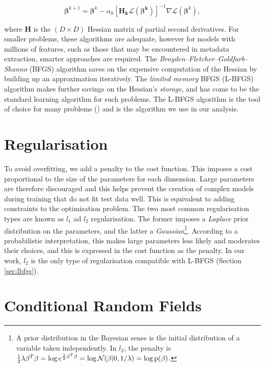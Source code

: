 \begin{equation}
\boldsymbol\beta^{k+1} = \boldsymbol\beta^{k} - \alpha_k [\mathbf{H_k\mathcal{L}(\boldsymbol\beta^{k})}]^{-1}\nabla\mathcal{L}(\boldsymbol\beta^{k}),
\label{eq:newton}
\end{equation}

where $\mathbf{H}$ is the $(D \times D)$ Hessian matrix of partial second derivatives. For smaller problems, these algorithms are adequate, however for models with millions of features, such as those that may be encountered in metadata extraction, smarter approaches are required. The \emph{Broyden--Fletcher--Goldfarb--Shanno} (BFGS) algorithm saves on the expensive computation of the Hessian by building up an approximation iteratively. The \emph{limited memory} BFGS (L-BFGS) algorithm makes further savings on the Hessian's \emph{storage}, and has come to be the standard learning algorithm for such problems. The L-BFGS algorithm is the tool of choice for many problems (\cite{murphy2012machine}) and is the algorithm we use in our analysis.

\section{Regularisation}

To avoid overfitting, we add a penalty to the cost function. This imposes a cost proportional to the size of the parameters for each dimension. Large parameters are therefore discouraged and this helps prevent the creation of complex models during training that do not fit test data well. This is equivalent to adding constraints to the optimisation problem. The two most common regularisation types are known as $l_1$ ad $l_2$ regularisation. The former imposes a \emph{Laplace} prior distribution on the parameters, and the latter a \emph{Gaussian}\footnote{A prior distribution in the Bayesian sense is the initial distribution of a variable taken independently. In $l_2$, the penalty is $\frac{1}{2}\lambda\beta^T\beta = \log e^{\frac{\lambda}{2}\beta^T\beta} = \log \mathcal{N}(\beta|0, 1/\lambda) = \log\text{p}(\beta)$.}. According to a probabilistic interpretation, this makes large parameters less likely and moderates their choices, and this is expressed in the cost function as the penalty. In our work, $l_2$ is the only type of regularisation compatible with L-BFGS (Section \ref{sec:lbfgs}).

\section{Conditional Random Fields}
\label{subsec:crfs}


